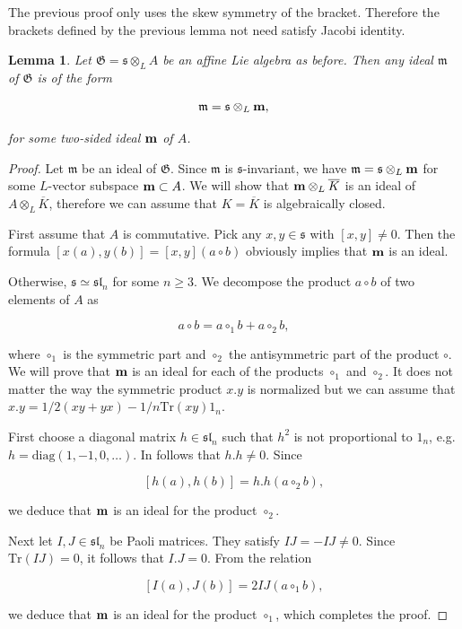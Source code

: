 \documentclass[11pt, letterpaper, reqno]{amsart}
\newtheorem{lemma}[theorem]{Lemma}
\theoremstyle{definition}
\newcommand{\fsl}{\mathfrak{sl}}
\newcommand{\fm}{\mathfrak{m}}
\newcommand{\fs}{\mathfrak{s}}
\newcommand{\fG}{\mathfrak{G}}
\newcommand{\diag}{\mathrm{diag}}
\newcommand{\Tr}{{\mathrm {Tr}}}
\begin{document}
 The previous proof only uses the skew symmetry of the bracket. Therefore the brackets defined by the previous lemma not need satisfy Jacobi identity. 

\begin{lemma}\label{corres} Let 
$\fG=\fs\otimes_L A$ be an affine Lie algebra as before. Then any ideal $\fm$ of $\fG$ is of the form

$$\fm=\fs\otimes_{L} {\bf m},$$

\noindent for some two-sided ideal $\bf{m}$ of $A$.
\end{lemma}

\begin{proof} Let $\fm$ be an ideal of $\fG$.
Since $\fm$ is $\fs$-invariant, we have
$\fm=\fs\otimes_L {\bf m}$ for some
$L$-vector subspace ${\bf m}\subset A$.
We will show that ${\bf m}\otimes_L\overline{K}$
is an ideal of $A\otimes_L\overline{K}$, therefore we can assume that $K=\overline{K}$
is algebraically closed.

First assume that $A$ is commutative. Pick
any $x, y\in \fs$ with $[x,y]\neq 0$. Then the formula 
$[x(a),y(b)]=[x,y](a\circ b)$ obviously implies
that ${\bf m}$ is an ideal.

Otherwise, $\fs\simeq \fsl_n$ for some 
$n\geq 3$. We decompose the product
$a\circ b$ of two elements of $A$ as

$$a\circ b=a\circ_1 b+ a\circ_2 b,$$

\noindent where $\circ_1$ is the symmetric part  and $\circ_2$ the antisymmetric part of the product $\circ$. We will prove that
${\bf m}$ is an ideal for each of the products
$\circ_1$ and $\circ_2$.
It does not matter the way   the symmetric product $x.y$ is normalized but we can assume that $x.y=1/2(xy+yx) -1/n \Tr(xy) 1_n$.

First choose a diagonal matrix $h\in\fsl_n$
such that $h^2$ is not proportional to $1_n$,
e.g. $h=\diag(1,-1,0,\ldots)$.
In follows that  $h.h\neq 0$. Since

$$[h(a),h(b)]=h.h(a\circ_2 b),$$

\noindent we deduce that $\bf{m}$ is an ideal for the product $\circ_2$. 

Next let $I,J\in \fsl_n$ be Paoli matrices.
They satisfy $IJ=-IJ\neq 0$. Since $\Tr(IJ)=0$, it follows  that 
$I.J=0$. From the relation

$$[I(a),J(b)]=2IJ(a\circ_1 b),$$

\noindent we deduce that $\bf{m}$ is an ideal for the product $\circ_1$, which completes the proof.
\end{proof}
\end{document}
